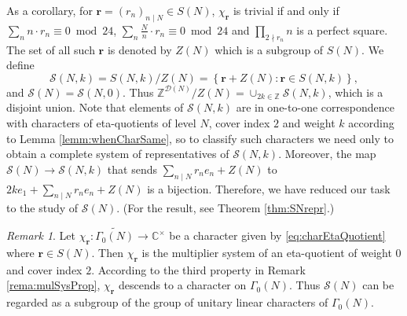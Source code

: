 \documentclass[12pt]{amsart}
\numberwithin{equation}{section}
\theoremstyle{plain}
\theoremstyle{definition}
\theoremstyle{remark}
\newtheorem{rema}[thm]{Remark}
\newcommand\numZ{\mathbb{Z}}
\newcommand\numC{\mathbb{C}}
\begin{document}
As a corollary, for $\mathbf{r}=(r_n)_{n\mid N}\in S(N)$, $\chi_{\mathbf{r}}$ is trivial if and only if $\sum_{n}n\cdot r_n\equiv0\bmod{24}$, $\sum_{n}\frac{N}{n}\cdot r_n\equiv0\bmod{24}$ and $\prod_{2\nmid r_n}n$ is a perfect square. The set of all such $\mathbf{r}$ is denoted by $Z(N)$ which is a subgroup of $S(N)$. We define
\begin{equation*}
\mathscr{S}(N,k)=S(N,k)/Z(N)=\left\{\mathbf{r}+Z(N)\colon\mathbf{r}\in S(N,k)\right\},
\end{equation*}
and $\mathscr{S}(N)=\mathscr{S}(N,0)$.
Thus $\numZ^{\mathscr{D}(N)}/Z(N)=\cup_{2k\in\numZ}\mathscr{S}(N,k)$, which is a disjoint union. Note that elements of $\mathscr{S}(N,k)$ are in one-to-one correspondence with characters of eta-quotients of level $N$, cover index $2$ and weight $k$ according to Lemma \ref{lemm:whenCharSame}, so to classify such characters we need only to obtain a complete system of representatives of $\mathscr{S}(N,k)$. Moreover, the map $\mathscr{S}(N)\to\mathscr{S}(N,k)$ that sends $\sum_{n\mid N}r_ne_n+Z(N)$ to $2ke_1+\sum_{n\mid N}r_ne_n+Z(N)$ is a bijection. Therefore, we have reduced our task to the study of $\mathscr{S}(N)$. (For the result, see Theorem \ref{thm:SNrepr}.)
\begin{rema}
\label{rema:SNsubgroup}
Let $\chi_{\mathbf{r}}\colon\widetilde{\Gamma_0(N)}\to\numC^\times$ be a character given by \eqref{eq:charEtaQuotient} where $\mathbf{r}\in S(N)$. Then $\chi_{\mathbf{r}}$ is the multiplier system of an eta-quotient of weight $0$ and cover index $2$. According to the third property in Remark \ref{rema:mulSysProp}, $\chi_{\mathbf{r}}$ descends to a character on $\Gamma_0(N)$. Thus $\mathscr{S}(N)$ can be regarded as a subgroup of the group of unitary linear characters of $\Gamma_0(N)$.
\end{rema}
\end{document}
